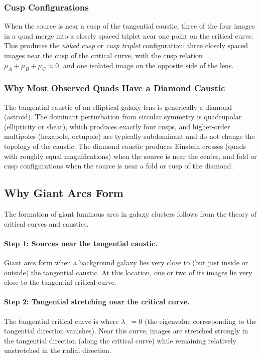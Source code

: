 \subsubsection{Cusp Configurations}

When the source is near a cusp of the tangential caustic, three of
the four images in a quad merge into a closely spaced triplet near
one point on the critical curve.  This produces the \emph{naked cusp}
or \emph{cusp triplet} configuration: three closely spaced images
near the cusp of the critical curve, with the cusp relation
$\mu_A + \mu_B + \mu_C \approx 0$, and one isolated image on the
opposite side of the lens.

\subsubsection{Why Most Observed Quads Have a Diamond Caustic}

The tangential caustic of an elliptical galaxy lens is generically a
diamond (astroid).  The dominant perturbation from circular symmetry
is quadrupolar (ellipticity or shear), which produces exactly four
cusps, and higher-order multipoles (hexapole, octupole) are typically
subdominant and do not change the topology of the caustic.  The
diamond caustic produces Einstein crosses (quads with roughly equal
magnifications) when the source is near the center, and fold or cusp
configurations when the source is near a fold or cusp of the
diamond.


\subsection{Why Giant Arcs Form}
\label{sec:giant_arcs_preview}

The formation of giant luminous arcs in galaxy clusters follows
from the theory of critical curves and caustics.

\paragraph{Step 1: Sources near the tangential caustic.}
Giant arcs form when a background galaxy lies very close to (but
just inside or outside) the tangential caustic.  At this location,
one or two of its images lie very close to the tangential critical
curve.

\paragraph{Step 2: Tangential stretching near the critical curve.}
The tangential critical curve is where $\lambda_- = 0$ (the
eigenvalue corresponding to the tangential direction vanishes).
Near this curve, images are stretched strongly in the
tangential direction (along the critical curve) while
remaining relatively unstretched in the radial direction.


